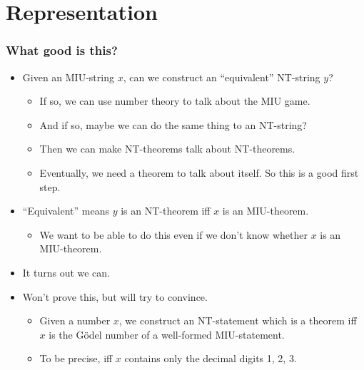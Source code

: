 \documentclass[mathserif]{beamer}
\begin{document}
\section{Representation}
\label{sec-4}
\begin{frame}
\frametitle{What good is this?}
\label{sec-4-1}
\begin{itemize}

\item Given an MIU-string $x$, can we construct an ``equivalent'' NT-string $y$?
\label{sec-4-1-1}%
\begin{itemize}

\item If so, we can use number theory to talk about the MIU game.\\
\label{sec-4-1-1-1}%
\item And if so, maybe we can do the same thing to an NT-string?\\
\label{sec-4-1-1-2}%
\item Then we can make NT-theorems talk about NT-theorems.\\
\label{sec-4-1-1-3}%
\item Eventually, we need a theorem to talk about itself. So this is a good first step.\\
\label{sec-4-1-1-4}%
\end{itemize} %

\item ``Equivalent'' means $y$ is an NT-theorem iff $x$ is an MIU-theorem.
\label{sec-4-1-2}%
\begin{itemize}

\item We want to be able to do this even if we don't know whether $x$ is an MIU-theorem.\\
\label{sec-4-1-2-1}%
\end{itemize} %

\item It turns out we can.\\
\label{sec-4-1-3}%
\item Won't prove this, but will try to convince.
\label{sec-4-1-4}%
\begin{itemize}

\item Given a number $x$, we construct an NT-statement which is a theorem iff $x$ is the Gödel number of a well-formed MIU-statement.\\
\label{sec-4-1-4-1}%
\item To be precise, iff $x$ contains only the decimal digits 1, 2, 3.\\
\label{sec-4-1-4-2}%
\end{itemize} %
\end{itemize} %
\end{frame}
\end{document}
